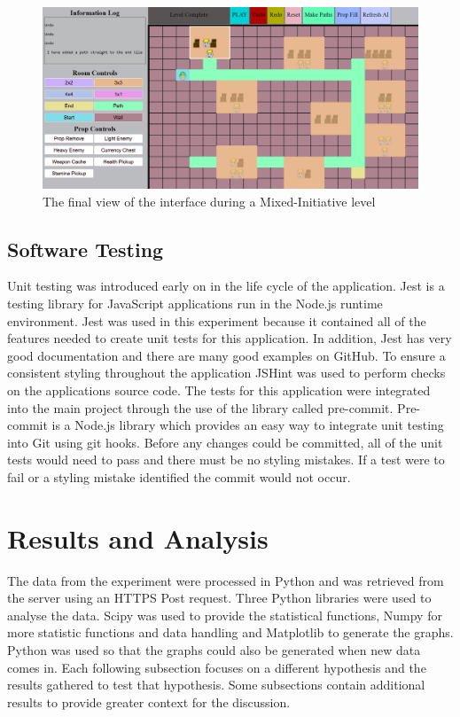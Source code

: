 \documentclass[journal]{IEEEtran}
\begin{document}
\begin{figure}[h]
	\includegraphics[width=1.0\linewidth]{LevelEditorFinal.PNG}
	\caption{The final view of the interface during a Mixed-Initiative level}
	\label{levelEditorFinal}
\end{figure} 

\subsection{Software Testing}
Unit testing was introduced early on in the life cycle of the application. Jest is a testing library for JavaScript applications run in the Node.js runtime environment. Jest was used in this experiment because it contained all of the features needed to create unit tests for this application. In addition, Jest has very good documentation and there are many good examples on GitHub.  To ensure a consistent styling throughout the application JSHint was used to perform checks on the applications source code. The tests for this application were integrated into the main project through the use of the library called pre-commit. Pre-commit is a  Node.js library which provides an easy way to integrate unit testing into Git using git hooks. Before any changes could be committed, all of the unit tests would need to pass and there must be no styling mistakes. If a test were to fail or a styling mistake identified the commit would not occur. 


\section{Results and Analysis}
The data from the experiment were processed in Python and was retrieved from the server using an HTTPS Post request. Three Python libraries were used to analyse the data. Scipy was used to provide the statistical functions, Numpy for more statistic functions and data handling and Matplotlib to generate the graphs. Python was used so that the graphs could also be generated when new data comes in. Each following subsection focuses on a different hypothesis and the results gathered to test that hypothesis. Some subsections contain additional results to provide greater context for the discussion.
\end{document}
